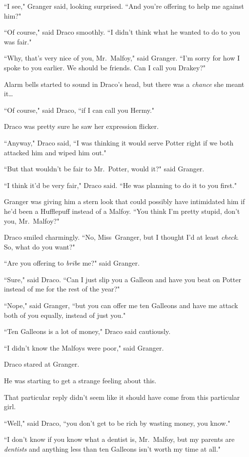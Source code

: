 ``I see," Granger said, looking surprised. ``And you're offering to help me against him?"

``Of course," said Draco smoothly. ``I didn't think what he wanted to do to you was fair."

``Why, that's very nice of you, Mr.~Malfoy," said Granger. ``I'm sorry for how I spoke to you earlier. We should be friends. Can I call you Drakey?"

Alarm bells started to sound in Draco's head, but there was a \emph{chance} she meant it{\ldots}

``Of course," said Draco, ``if I can call you Hermy."

Draco was pretty sure he saw her expression flicker.

``Anyway," Draco said, ``I was thinking it would serve Potter right if we both attacked him and wiped him out."

``But that wouldn't be fair to Mr.~Potter, would it?" said Granger.

``I think it'd be very fair," Draco said. ``He was planning to do it to you first."

Granger was giving him a stern look that could possibly have intimidated him if he'd been a Hufflepuff instead of a Malfoy. ``You think I'm pretty stupid, don't you, Mr.~Malfoy?"

Draco smiled charmingly. ``No, Miss~Granger, but I thought I'd at least \emph{check}. So, what do you want?"

``Are you offering to \emph{bribe} me?" said Granger.

``Sure," said Draco. ``Can I just slip you a Galleon and have you beat on Potter instead of me for the rest of the year?"

``Nope," said Granger, ``but you can offer me ten Galleons and have me attack both of you equally, instead of just you."

``Ten Galleons is a lot of money," Draco said cautiously.

``I didn't know the Malfoys were poor," said Granger.

Draco stared at Granger.

He was starting to get a strange feeling about this.

That particular reply didn't seem like it should have come from this particular girl.

``Well," said Draco, ``you don't get to be rich by wasting money, you know."

``I don't know if you know what a dentist is, Mr.~Malfoy, but my parents are \emph{dentists} and anything less than ten Galleons isn't worth my time at all."

